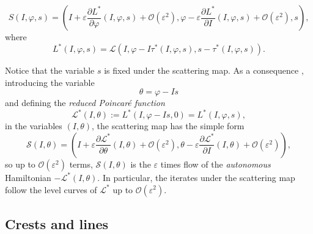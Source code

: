 \documentclass[a4paper,10pt]{article}
\newcommand{\NH}{\text{NHIM}}
\theoremstyle{definition}
\begin{document}
\begin{equation*}
S(I,\varphi,s) = \left(I + \varepsilon\frac{\partial L^*}{\partial \varphi}(I,\varphi,s) + \mathcal{O}(\varepsilon^2) , \varphi - \varepsilon\frac{\partial L^*}{\partial I}(I,\varphi,s) +\mathcal{O}(\varepsilon^2) , s \right),
\end{equation*}
where
\begin{equation}
L^*(I,\varphi,s) = \mathcal{L}(I,\varphi - I\tau^*(I,\varphi,s) , s-\tau^*(I,\varphi,s)).\label{eq:L^*-def}
\end{equation}

Notice that the variable $s$ is fixed under the scattering map.
As a consequence \cite{Delshams2011,Delshams2017}, introducing the variable
\begin{equation*}
\theta = \varphi - I s 
\end{equation*}
and defining the \emph{reduced Poincar\'{e} function}
\begin{equation}\label{eq:reduced_poincare_function}
\mathcal{L}^{*}(I,\theta) := L^*(I,\varphi - Is , 0) = L^*(I,\varphi,s),
\end{equation}
in the variables $(I,\theta)$, the scattering map has the simple form
\begin{equation*}
\mathcal{S}(I,\theta) = \left( I + \varepsilon\frac{\partial \mathcal{L}^*}{\partial\theta}(I,\theta) + \mathcal{O}(\varepsilon^2) , \theta - \varepsilon\frac{\partial \mathcal{L}^*}{\partial I}(I,\theta) + \mathcal{O}(\varepsilon^2)   \right),
\end{equation*}
so up to $\mathcal{O}(\varepsilon^2)$ terms, $\mathcal{S}(I,\theta)$ is the $\varepsilon$ times flow of the \emph{autonomous} Hamiltonian $-\mathcal{L}^*(I,\theta)$.
In particular, the iterates under the scattering map follow the level curves of $\mathcal{L}^*$ up to $\mathcal{O}(\varepsilon^2)$.

\subsection{Crests and {\NH} lines}
\end{document}
